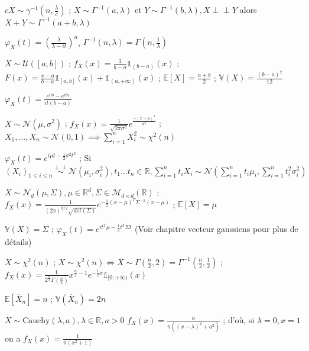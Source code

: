 \documentclass[12pt]{article}
\newcommand{\petitespace}{\vspace{0.5cm}}
\newcommand{\bb}[1]{\mathbb{#1}} %
\newcommand{\R}{\bb{R}} %
\newcommand{\somme}[2]{\sum\limits_{#1}^{#2}}
\renewcommand{\cal}{\mathcal}
\newcommand{\gam}[2]{\Gamma(#1,#2)}%
\newcommand{\gaminv}[2]{\Gamma^{-1}(#1,#2)}%
\newcommand{\chideux}[1]{\chi^2(#1)} %
\newcommand{\normale}[2]{\mathcal{N}(#1,#2)} %
\newcommand{\Xunan}{X_1,\ldots,X_n} %
\newcommand{\esp}[1]{\bb{ E} \mathopen{}\left[#1\right]} %
\newcommand{\Var}[1]{\bb{ V} \mathopen{}\left(#1\right)} %
\newcommand{\indep}{\perp \!\!\! \perp} %
\newcommand{\1}{\bb{1}} %
\newcommand{\densnorm}[3]{\frac{1}{\sqrt{2\pi#2^2}}e^{\frac{-(#3-#1)^2}{#2^2}}} %
\newcommand{\densgam}[3]{\frac{1}{#2^#1\Gamma(#1)}#3^{#1-1}e^{-\frac{1}{#2}#3}\1_{[0;+\infty)}(#3)} %
\begin{document}
$cX \sim \gamma^{-1}(n,\frac \lambda c)$ ; $X \sim \gaminv{a}{\lambda}$ et $Y\sim\gaminv{b}{\lambda}, X\indep Y$ alors $X+Y \sim \gaminv{a+b}{\lambda}$ \petitespace

 $\varphi_X(t) = (\frac{\lambda}{\lambda-it})^n$, $\gaminv{n}{\lambda}=\gam{n}{\frac 1\lambda}$



\vspace{2em}



$\boxed{X \sim \mathcal{U}([a,b])}$ ; $f_X(x)=\frac{1}{b-a}\mathbb{1}_{(b-a)}(x)$ ; $F(x) = \frac{x-a}{b-a}\1_{[a,b]}(x)+\1_{(a, +\infty)}(x) $ ; $\esp{X}=\frac{a+b}2$ ; $\Var{X}=\frac{(b-a)^2}{12}$ \petitespace

 $\varphi_X(t)= \frac{e^{itb}-e^{ita}}{it(b-a)}$   \vspace{2em}




$ \boxed{X\sim \normale{\mu}{\sigma^2}}$ ; $f_X(x)=\densnorm{\mu}{\sigma}{x}$ ; $\Xunan \sim \normale{0}{1 } \implies \sum\limits_{i=1}^nX_i^2 \sim \chideux{n}$  \petitespace

$\varphi_X(t) = e^{i\mu t - \frac{1}{2} \sigma^2 t^2}$ ; Si $(X_i)_{1\le i \le n} \overset{\indep}{\sim} \normale{\mu_i}{\sigma_i^2}, t_1 \ldots t_n \in \R, \somme{i=1}{n}t_iX_i \sim \normale{\somme{i=1}{n}t_i\mu_i}{\somme{i=1}{n}t_i^2\sigma_i^2}$\vspace{2em}



$ \boxed{X\sim \cal N_d(\mu,\Sigma), \mu \in \R^d, \Sigma \in \cal M_{d\times d}(\R)}$ ; $f_X(x) = \frac{1}{(2\pi)^{d/2}\sqrt{ det(\Sigma)}}e^{-\frac12 (x-\mu)^T\Sigma^{-1}(x-\mu)}$ ; $\esp{X}=\mu$ \petitespace

$\Var{X}=\Sigma$ ; $\varphi_X(t) = e^{it^T\mu -\frac 12 t^T\Sigma t}$ (Voir chapitre vecteur gaussiens pour plus de détails) \vspace{2em}



$\boxed{X\sim \chideux{n}}$ ; $X\sim \chideux{n} \iff X \sim \gam{\frac{n}{2}}{2} = \gaminv{\frac n2}{\frac 12}$ ; $f_X(x)=\densgam{\frac{n}{2}}{2}{x}$\petitespace

  $\esp{\overline{X}_n}=n$ ; $\bb{V}(\overline{X}_n)=2n$\vspace{2em}


$\boxed{X\sim \text{Cauchy}(\lambda, a), \lambda \in \R, a>0}$ $f_X(x) = \frac{a}{\pi ((x-\lambda)^2+a^2)}$ ; d'où, si $\lambda =0, x=1$ on a $f_X(x) = \frac{1}{\pi (x^2+1)}$ \petitespace
\end{document}

